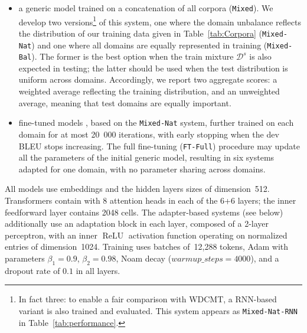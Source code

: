\documentclass[11pt,a4paper]{article}
\newcommand{\fyDone}[1]{\done[FY]\Todo[FY:]{\textcolor{orange}{#1}}}
\newcommand{\jcDone}[1]{\done[JC]\Todo[JC:]{\textcolor{red}{#1}}}
\newcommand{\revision}[1]{#1}
\newcommand{\revisiondel}[1]{}
\newcommand{\system}[1]{\texttt{{#1}}}
\begin{document}
\begin{itemize}
\item a generic model trained on a concatenation of all corpora (\texttt{Mixed}). We develop two versions\footnote{In fact three: to enable a fair comparison with WDCMT, a RNN-based variant is also trained and evaluated. \revision{This system appears as \system{Mixed-Nat-RNN} in Table~\ref{tab:performance}}.} of this system, one where the domain unbalance reflects the distribution of our training data \revision{given in Table~\ref{tab:Corpora}} (\system{Mixed-Nat}) and one where all domains are equally represented in training (\system{Mixed-Bal}). The former is the best option when the train mixture $\mathcal{D}^s$ is also expected in testing; the latter should be used when the test distribution is uniform across domains. Accordingly, we report two aggregate scores: a weighted average reflecting the training distribution, and an unweighted average, meaning that test domains are equally important.
\item fine-tuned models \cite{Luong15stanford,Freitag16fast}\jcDone{i would use Luong and Manning 2015}, based on the \system{Mixed-Nat} system, further trained on each domain for at most 20~000 iterations, with early stopping when the dev BLEU stops increasing. The full fine-tuning (\system{FT-Full}) procedure may update all the parameters of the initial generic model, resulting in six systems adapted for one domain, with no parameter sharing across domains.
\revisiondel{We again contrast two versions: full fine-tuning (\system{FT-Full}), which may update all the parameters of the initial generic model; and the variant of \cite{Bapna19simple}, where fine-tuning only updates a small adaptation module that is added (with residualconnections) on top of every Transformer layer (\system{FT-Res}).}
\end{itemize}

All models use embeddings and the hidden layers sizes of dimension~512. Transformers contain with 8 attention heads in each of the 6+6 layers; the inner feedforward layer contains 2048 cells. The adapter-based systems (see below) additionally use an adaptation block in each layer, composed of a 2-layer perceptron, with an inner $\operatorname{ReLU}$ activation function operating on normalized entries of dimension~1024. 
Training uses batches of~12,288 tokens, Adam with parameters $\beta_1=0.9$, $\beta_2= 0.98$, Noam decay ($warmup\_steps=4000$), and a dropout rate of $0.1$ in all layers.\fyDone{Describe the block adaptation layer - voir slides} 
\end{document}
